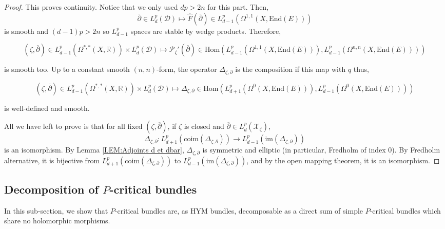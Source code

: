 \documentclass{article}
\theoremstyle{remark}
\theoremstyle{definition}
\newcommand{\R}{\mathbb{R}}
\newcommand{\im}{\mathrm{im}}
\newcommand{\coim}{\mathrm{coim}}
\newcommand{\Hom}{\mathrm{Hom}}
\newcommand{\End}{\mathrm{End}}
\newcommand{\mP}{\mathcal{P}}
\newcommand{\mX}{\mathcal{X}}
\newcommand{\dbar}{\overline{\partial}}
\begin{document}
\begin{proof}
This proves continuity. Notice that we only used $dp > 2n$ for this part. Then,
$$
\dbar \in L_d^p(\mathcal{D}) \mapsto \hat{F}(\dbar) \in L_{d - 1}^p(\Omega^{1,1}(X,\End(E)))
$$
is smooth and $(d - 1)p > 2n$ so $L_{d - 1}^p$ spaces are stable by wedge products. Therefore,
\begin{adjustwidth}{-2cm}{-2cm}
$$
(\zeta,\dbar) \in L_{d - 1}^p(\Omega^{*,*}(X,\R)) \times L_d^p(\mathcal{D}) \mapsto \mP_\zeta'(\dbar) \in \Hom(L_{d - 1}^p(\Omega^{1,1}(X,\End(E))),L_{d - 1}^p(\Omega^{n,n}(X,\End(E))))
$$
\end{adjustwidth}
is smooth too. Up to a constant smooth $(n,n)$-form, the operator $\Delta_{\zeta,\partial}$ is the composition if this map with $q$ thus,
\begin{adjustwidth}{-2cm}{-2cm}
$$
(\zeta,\dbar) \in L_{d - 1}^p(\Omega^{*,*}(X,\R)) \times L_d^p(\mathcal{D}) \mapsto \Delta_{\zeta,\partial} \in \Hom(L_{d + 1}^p(\Omega^0(X,\End(E))),L_{d - 1}^p(\Omega^0(X,\End(E))))
$$
\end{adjustwidth}
is well-defined and smooth.

All we have left to prove is that for all fixed $(\zeta,\dbar)$, if $\zeta$ is closed and $\dbar \in L_d^p(\mX_\zeta)$,
$$
\Delta_{\zeta,\partial} : L_{d + 1}^p(\coim(\Delta_{\zeta,\partial})) \rightarrow L_{d - 1}^p(\im(\Delta_{\zeta,\partial}))
$$
is an isomorphism. By Lemma \ref{LEM:Adjoints d et dbar}, $\Delta_{\zeta,\partial}$ is symmetric and elliptic (in particular, Fredholm of index $0$). By Fredholm alternative, it is bijective from $L_{d + 1}^p(\coim(\Delta_{\zeta,\partial}))$ to $L_{d - 1}^p(\im(\Delta_{\zeta,\partial}))$, and by the open mapping theorem, it is an isomorphism.
\end{proof}

\subsection{Decomposition of $P$-critical bundles}

In this sub-section, we show that $P$-critical bundles are, as HYM bundles, decomposable as a direct sum of simple $P$-critical bundles which share no holomorphic morphisms.
\end{document}
